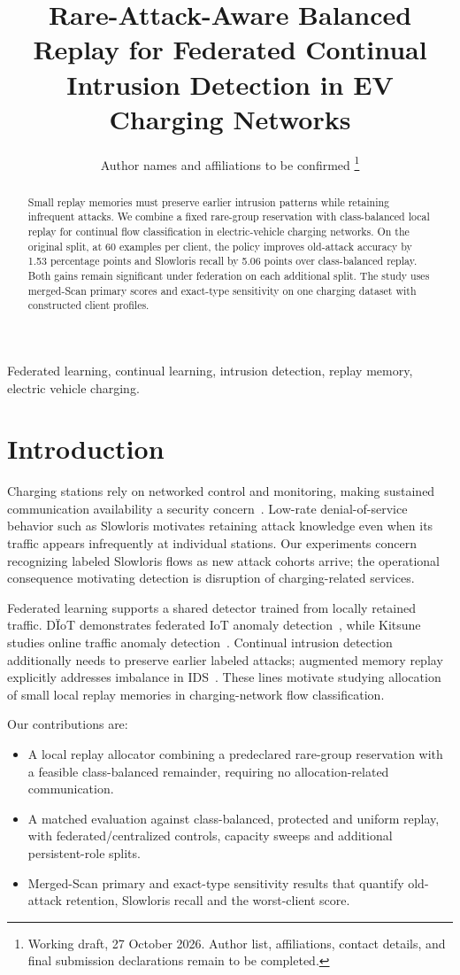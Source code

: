 \documentclass[journal,10pt]{IEEEtran}
\title{Rare-Attack-Aware Balanced Replay for Federated Continual Intrusion Detection in EV Charging Networks}
\author{Author names and affiliations to be confirmed%
\thanks{Working draft, 27 October 2026. Author list, affiliations, contact details, and final submission declarations remain to be completed.}}
\begin{document}
\maketitle
\begin{abstract}
Small replay memories must preserve earlier intrusion patterns while retaining infrequent attacks. We combine a fixed rare-group reservation with class-balanced local replay for continual flow classification in electric-vehicle charging networks. On the original split, at 60 examples per client, the policy improves old-attack accuracy by 1.53 percentage points and Slowloris recall by 5.06 points over class-balanced replay. Both gains remain significant under federation on each additional split. The study uses merged-Scan primary scores and exact-type sensitivity on one charging dataset with constructed client profiles.
\end{abstract}
\begin{IEEEkeywords}
Federated learning, continual learning, intrusion detection, replay memory, electric vehicle charging.
\end{IEEEkeywords}

\section{Introduction}
Charging stations rely on networked control and monitoring, making sustained communication availability a security concern~\cite{ocpp,dataset}. Low-rate denial-of-service behavior such as Slowloris motivates retaining attack knowledge even when its traffic appears infrequently at individual stations. Our experiments concern recognizing labeled Slowloris flows as new attack cohorts arrive; the operational consequence motivating detection is disruption of charging-related services.

Federated learning supports a shared detector trained from locally retained traffic. D\"IoT demonstrates federated IoT anomaly detection~\cite{diot}, while Kitsune studies online traffic anomaly detection~\cite{kitsune}. Continual intrusion detection additionally needs to preserve earlier labeled attacks; augmented memory replay explicitly addresses imbalance in IDS~\cite{amr}. These lines motivate studying allocation of small local replay memories in charging-network flow classification.

Our contributions are:
\begin{itemize}
\item A local replay allocator combining a predeclared rare-group reservation with a feasible class-balanced remainder, requiring no allocation-related communication.
\item A matched evaluation against class-balanced, protected and uniform replay, with federated/centralized controls, capacity sweeps and additional persistent-role splits.
\item Merged-Scan primary and exact-type sensitivity results that quantify old-attack retention, Slowloris recall and the worst-client score.
\end{itemize}
\end{document}
